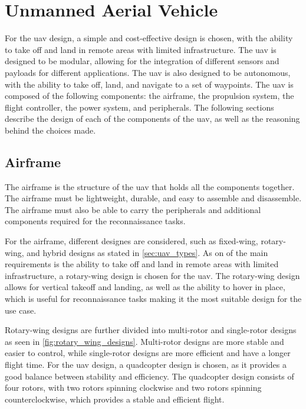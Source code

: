 \section{Unmanned Aerial Vehicle}\label{sec:design_uav}

For the \gls{uav} design, a simple and cost-effective design is chosen, with the ability to take off and land in remote areas with limited infrastructure. The \gls{uav} is designed to be modular, allowing for the integration of different sensors and payloads for different applications. The \gls{uav} is also designed to be autonomous, with the ability to take off, land, and navigate to a set of waypoints. The \gls{uav} is composed of the following components: the airframe, the propulsion system, the flight controller, the power system, and peripherals. The following sections describe the design of each of the components of the \gls{uav}, as well as the reasoning behind the choices made.

\subsection{Airframe}\label{subsec:design_airframe}

The airframe is the structure of the \gls{uav} that holds all the components together. The airframe must be lightweight, durable, and easy to assemble and disassemble. The airframe must also be able to carry the peripherals and additional components required for the reconnaissance tasks.

For the airframe, different designes are considered, such as fixed-wing, rotary-wing, and hybrid designs as stated in \cref{sec:uav_types}. As on of the main requirements is the ability to take off and land in remote areas with limited infrastructure, a rotary-wing design is chosen for the \gls{uav}. The rotary-wing design allows for vertical takeoff and landing, as well as the ability to hover in place, which is useful for reconnaissance tasks making it the most suitable design for the use case.

Rotary-wing designs are further divided into multi-rotor and single-rotor designs as seen in \cref{fig:rotary_wing_designs}. Multi-rotor designs are more stable and easier to control, while single-rotor designs are more efficient and have a longer flight time. For the \gls{uav} design, a quadcopter design is chosen, as it provides a good balance between stability and efficiency. The quadcopter design consists of four rotors, with two rotors spinning clockwise and two rotors spinning counterclockwise, which provides a stable and efficient flight.

